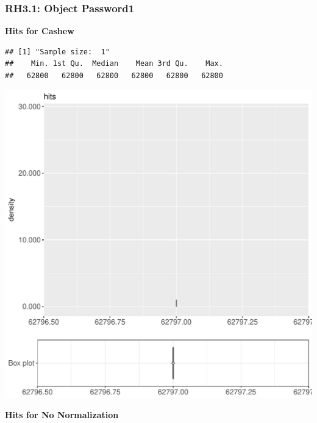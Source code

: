 \documentclass{article}\usepackage[]{graphicx}\usepackage[]{color}
\makeatletter
\def\maxwidth{ %
  \ifdim\Gin@nat@width>\linewidth
    \linewidth
  \else
    \Gin@nat@width
  \fi
}
\newenvironment{kframe}{%
 \def\at@end@of@kframe{}%
 \ifinner\ifhmode%
  \def\at@end@of@kframe{\end{minipage}}%
  \begin{minipage}{\columnwidth}%
 \fi\fi%
 \def\FrameCommand##1{\hskip\@totalleftmargin \hskip-\fboxsep
 \colorbox{shadecolor}{##1}\hskip-\fboxsep
     \hskip-\linewidth \hskip-\@totalleftmargin \hskip\columnwidth}%
 \MakeFramed {\advance\hsize-\width
   \@totalleftmargin\z@ \linewidth\hsize
   \@setminipage}}%
 {\par\unskip\endMakeFramed%
 \at@end@of@kframe}
\newenvironment{knitrout}{}{} %
\makeatother
\begin{document}
\subsubsection{RH3.1: Object Password1}

 \textbf{Hits for Cashew}
\begin{knitrout}
\color{fgcolor}\begin{kframe}
\begin{verbatim}
## [1] "Sample size:  1"
##    Min. 1st Qu.  Median    Mean 3rd Qu.    Max. 
##   62800   62800   62800   62800   62800   62800
\end{verbatim}


{\ttfamily\noindent\bfseries{}}\end{kframe}
\includegraphics[width=\maxwidth]{figure/RH3_cashew_password-1} 

\end{knitrout}
 \textbf{Hits for No Normalization}
\end{document}
